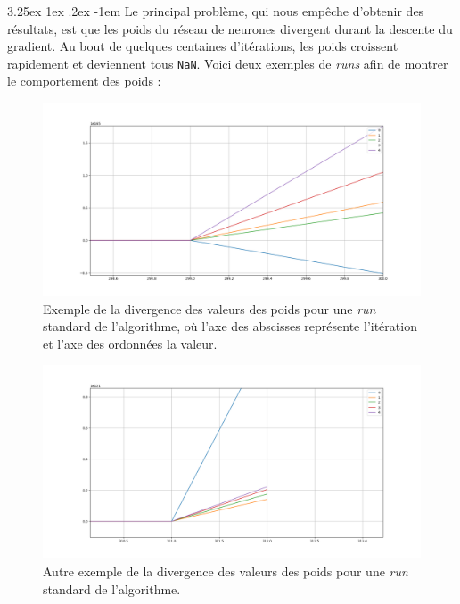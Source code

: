 \documentclass[a4paper, 11pt]{article}
\makeatletter
\renewcommand\paragraph{\@startsection{paragraph}{5}{\z@}%
  {3.25ex \@plus1ex \@minus.2ex}%
  {-1em}%
  {\normalfont\normalsize\bfseries}}
\makeatother
\begin{document}
\paragraph{}
Le principal problème, qui nous empêche d'obtenir des résultats, est que les poids du réseau de neurones divergent durant la descente du gradient.
Au bout de quelques centaines d'itérations, les poids croissent rapidement et deviennent tous \texttt{NaN}. Voici deux exemples de \textit{runs} afin de
montrer le comportement des poids :
\begin{figure}[H]
\centering
\includegraphics[scale=0.40]{images/run_1}
\caption{Exemple de la divergence des valeurs des poids pour une \textit{run} standard de l'algorithme, où l'axe des abscisses représente l'itération et
l'axe des ordonnées la valeur.}
\end{figure}

\begin{figure}[H]
\centering
\includegraphics[scale=0.4]{images/run_2}
\caption{Autre exemple de la divergence des valeurs des poids pour une \textit{run} standard de l'algorithme.}
\end{figure}
\end{document}
